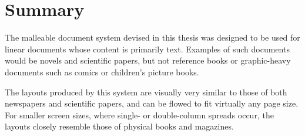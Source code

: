 

\section{Summary}
The malleable document system devised in this thesis was designed to be used for linear documents whose content is primarily text. Examples of such documents would be novels and scientific papers, but not reference books or graphic-heavy documents such as comics or children's picture books.

The layouts produced by this system are visually very similar to those of both newspapers and scientific papers, and can be flowed to fit virtually any page size. For smaller screen sizes, where single- or double-column spreads occur, the layouts closely resemble those of physical books and magazines.

